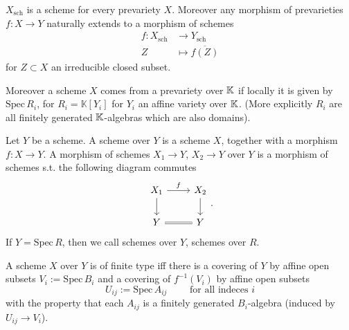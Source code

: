 \begin{prop}
	$X_{\text{sch}}$ is a scheme for every prevariety $X$.
	Moreover any morphism of prevarieties $f: X \to Y$
	naturally extends to a morphism of schemes
	\begin{align}
		f: X_{\text{sch}} &\to Y_{\text{sch}} \\
		Z &\mapsto \overline{f(Z)}
	\end{align} 
	for $Z \subset X$ an irreducible closed subset.
\end{prop} 

Moreover a scheme $X$ comes from a prevariety over $\mathbb{K}$ if
locally it is given by $\mathrm{Spec}\, R_i$, for $R_i = \mathbb{K}[Y_i]$
for $Y_i$ an affine variety over $\mathbb{K}$.
(More explicitly $R_i$ are all finitely generated $\mathbb{K}$-algebras which are also domains).

\begin{defn}[]
	Let $Y$ be a scheme.
	A scheme over $Y$ is a scheme $X$, together with a morphism $f: X \to Y$.
	A morphism of schemes $X_1 \to Y$, $X_2 \to Y$ over $Y$
	is a morphism of schemes s.t. the following diagram commutes
	\begin{equation}
	\begin{tikzcd}
		X_1 \arrow[r, "f", rightarrow] \arrow[d, "", rightarrow] &
		X_2 \arrow[d, "", rightarrow] \\
		Y \arrow[r, "", equal] &
		Y
	\end{tikzcd}
	.\end{equation} 
	If $Y = \mathrm{Spec}\, R$, then we call schemes over $Y$, schemes over $R$.
\end{defn}

\begin{defn}
	A scheme $X$ over $Y$ is of finite type iff there is a covering of $Y$
	by affine open subsets $V_i := \mathrm{Spec}\, B_i$
	and a covering of $f^{-1}(V_i)$ by affine open subsets
	\begin{equation}
	U_{ij} := \mathrm{Spec}\, A_{ij} \qquad \text{ for all indeces } i
	\end{equation} 
	with the property that each $A_{ij}$ is a finitely generated $B_i$-algebra
	(induced by $U_{ij} \to V_i$).
\end{defn}

